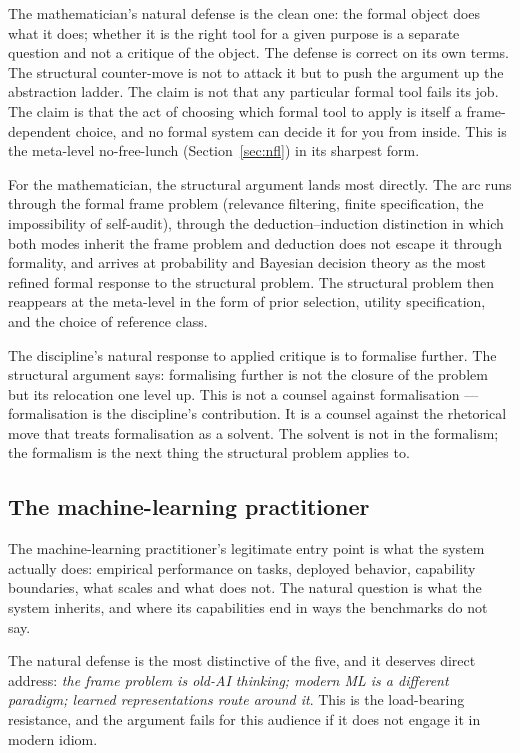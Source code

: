 \documentclass[11pt,a4paper]{article}
\begin{document}
The mathematician's natural defense is the clean one: the formal object
does what it does; whether it is the right tool for a given purpose is a
separate question and not a critique of the object. The defense is
correct on its own terms. The structural counter-move is not to attack it
but to push the argument up the abstraction ladder. The claim is not that
any particular formal tool fails its job. The claim is that the act of
choosing which formal tool to apply is itself a frame-dependent choice,
and no formal system can decide it for you from inside. This is the
meta-level no-free-lunch (Section~\ref{sec:nfl}) in its sharpest form.

For the mathematician, the structural argument lands most directly. The
arc runs through the formal frame problem (relevance filtering, finite
specification, the impossibility of self-audit), through the
deduction--induction distinction in which both modes inherit the frame
problem and deduction does not escape it through formality, and arrives
at probability and Bayesian decision theory as the most refined formal
response to the structural problem. The structural problem then reappears
at the meta-level in the form of prior selection, utility specification,
and the choice of reference class.

The discipline's natural response to applied critique is to formalise
further. The structural argument says: formalising further is not the
closure of the problem but its relocation one level up. This is not a
counsel against formalisation --- formalisation is the discipline's
contribution. It is a counsel against the rhetorical move that treats
formalisation as a solvent. The solvent is not in the formalism; the
formalism is the next thing the structural problem applies to.

\subsection{The machine-learning practitioner}
\label{sec:mlpractitioner}

The machine-learning practitioner's legitimate entry point is what the
system actually does: empirical performance on tasks, deployed behavior,
capability boundaries, what scales and what does not. The natural
question is what the system inherits, and where its capabilities end in
ways the benchmarks do not say.

The natural defense is the most distinctive of the five, and it deserves
direct address: \emph{the frame problem is old-AI thinking; modern ML is
a different paradigm; learned representations route around it}. This is
the load-bearing resistance, and the argument fails for this audience if
it does not engage it in modern idiom.
\end{document}
